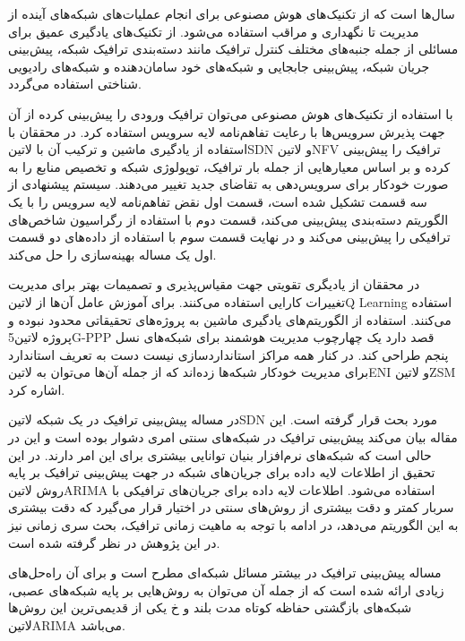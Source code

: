 سال‌ها است که از تکنیک‌های هوش مصنوعی برای انجام عملیات‌های شبکه‌های آینده از مدیریت تا نگهداری و مراقب استفاده می‌شود. از تکنیک‌های یادگیری عمیق
برای مسائلی از جمله جنبه‌های مختلف کنترل ترافیک مانند دسته‌بندی ترافیک شبکه، پیش‌بینی جریان شبکه، پیش‌بینی جابجایی
و شبکه‌های خود سامان‌دهنده و شبکه‌های رادیویی شناختی
استفاده می‌گردد. 

با استفاده از تکنیک‌های هوش مصنوعی می‌توان ترافیک ورودی را پیش‌بینی کرده از آن جهت پذیرش سرویس‌ها با رعایت تفاهم‌نامه لایه سرویس استفاده کرد. 
در  محققان با استفاده از یادگیری ماشین و ترکیب آن با ‌لاتین{SDN} و ‌لاتین{NFV} ترافیک را پیش‌بینی کرده و بر اساس معیارهایی از جمله بار ترافیک،
توپولوژی شبکه و تخصیص منابع را به صورت خودکار برای سرویس‌دهی به تقاضای جدید تغییر می‌دهند. سیستم پیشنهادی  از سه قسمت تشکیل شده است، قسمت اول
نقض تفاهم‌نامه لایه سرویس را با یک الگوریتم دسته‌بندی پیش‌بینی می‌کند، قسمت دوم با استفاده از رگراسیون شاخص‌های ترافیکی را پیش‌بینی می‌کند و در نهایت قسمت سوم با استفاده از
داده‌های دو قسمت اول یک مساله بهینه‌سازی را حل می‌کند.

در  محققان از یادیگری تقویتی جهت مقیاس‌پذیری و تصمیمات بهتر برای مدیریت تغییرات کارایی استفاده می‌کنند. برای آموزش عامل آن‌ها از ‌لاتین{Q Learning}
استفاده می‌کنند. استفاده از الگوریتم‌های یادگیری ماشین به پروژه‌های تحقیقاتی محدود نبوده و پروژه ‌لاتین{5G-PPP} قصد دارد یک چهارچوب مدیریت هوشمند برای شبکه‌های نسل پنجم
طراحی کند. در کنار همه مراکز استانداردسازی نیست دست به تعریف استاندارد برای مدیریت خودکار شبکه‌ها زده‌اند که از جمله آن‌ها می‌توان به ‌لاتین{ENI} و ‌لاتین{ZSM} اشاره کرد.

در  مساله پیش‌بینی ترافیک در یک شبکه ‌لاتین{SDN} مورد بحث قرار گرفته است. این مقاله بیان می‌کند پیش‌بینی ترافیک در
شبکه‌های سنتی امری دشوار بوده است و این در حالی است که شبکه‌های نرم‌افزار بنیان توانایی بیشتری برای این امر دارند. در این تحقیق از اطلاعات لایه
داده برای جریان‌های شبکه در جهت پیش‌بینی ترافیک بر پایه روش ‌لاتین{ARIMA} استفاده می‌شود.
اطلاعات لایه داده برای جریان‌های ترافیکی با سربار کمتر و دقت بیشتری از روش‌های سنتی در اختیار قرار می‌گیرد که دقت بیشتری به این الگوریتم می‌دهد،
در ادامه با توجه به ماهیت زمانی ترافیک، بحث سری زمانی نیز در این پژوهش در نظر گرفته شده است.

مساله پیش‌بینی ترافیک در بیشتر مسائل شبکه‌ای مطرح است و برای آن راه‌حل‌های زیادی ارائه شده است که از جمله آن می‌توان به روش‌هایی بر پایه شبکه‌های عصبی،
شبکه‌های بازگشتی حفاظه کوتاه مدت بلند و ‌خ
یکی از قدیمی‌ترین این روش‌ها ‌لاتین{ARIMA} می‌باشد.
